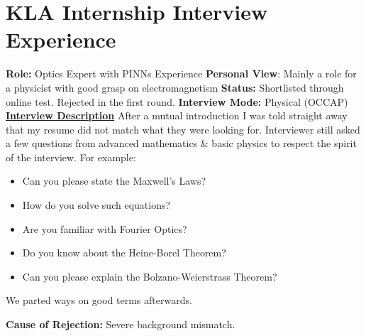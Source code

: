\documentclass[12pt]{article}
\begin{document}
\section{KLA Internship Interview Experience}
\textbf{Role:} Optics Expert with PINNs Experience
\newline
\textbf{Personal View}: Mainly a role for a physicist with good grasp on electromagnetism
\newline
\textbf{Status:} Shortlisted through online test. Rejected in the first round.
\newline
\textbf{Interview Mode:} Physical (OCCAP)
\vspace{10pt}
\newline
\underline{\textbf{Interview Description}}
\newline
After a mutual introduction I was told straight away that my resume did not match what they were looking for. Interviewer still asked a few questions from advanced mathematics \& basic physics to respect the spirit of the interview. For example:

\begin{itemize}
    \item Can you please state the Maxwell's Laws?
    \item How do you solve such equations?
    \item Are you familiar with Fourier Optics?
    \item Do you know about the Heine-Borel Theorem?
    \item Can you please explain the Bolzano-Weierstrass Theorem?
\end{itemize}

We parted ways on good terms afterwards.

\textbf{Cause of Rejection:} Severe background mismatch.
\end{document}
